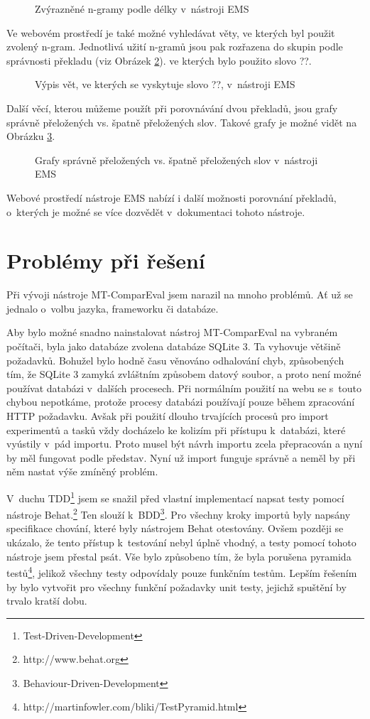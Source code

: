 \begin{figure}
  \caption{Zvýrazněné \mbox{n-gramy} podle délky v~nástroji EMS}
  \label{img:ems-sentence}
\end{figure}

Ve webovém prostředí je také možné vyhledávat věty,
  ve kterých byl použit zvolený \mbox{n-gram}.
Jednotlivá užití \mbox{n-gramů} jsou pak rozřazena do skupin podle správnosti překladu (viz Obrázek \ref{img:ems-word}).
  ve kterých bylo použito slovo ??.

\begin{figure}
  \caption{Výpis vět, ve kterých se vyskytuje slovo ??, v~nástroji EMS}
  \label{img:ems-word}
\end{figure}

Další věcí, kterou můžeme použít při porovnávání dvou překladů,
  jsou grafy správně přeložených vs. špatně přeložených slov.
Takové grafy je možné vidět na Obrázku \ref{img:ems-charts}.

\begin{figure}
  \caption{Grafy správně přeložených vs. špatně přeložených slov v~nástroji EMS}
  \label{img:ems-charts}
\end{figure}

Webové prostředí nástroje EMS nabízí i další možnosti porovnání překladů,
  o~kterých je možné se více dozvědět v~dokumentaci tohoto nástroje.

\section{Problémy při řešení}
Při vývoji nástroje MT-ComparEval jsem narazil na mnoho problémů.
Ať už se jednalo o~volbu jazyka, frameworku či databáze.

Aby bylo možné snadno nainstalovat nástroj MT-ComparEval na vybraném počítači,
  byla jako databáze zvolena databáze SQLite 3.
Ta vyhovuje většině požadavků.
Bohužel bylo hodně času věnováno odhalování chyb,
  způsobených tím,
  že SQLite 3 zamyká zvláštním způsobem datový soubor,
  a proto není možné používat databázi v~dalších procesech.
Při normálním použití na webu se s~touto chybou nepotkáme,
  protože procesy databázi používají pouze během zpracování HTTP požadavku.
Avšak při použití dlouho trvajících procesů pro import experimentů a tasků
  vždy docházelo ke kolizím při přístupu k~databázi,
  které vyústily v~pád importu.
Proto musel být návrh importu zcela přepracován a nyní by měl fungovat podle představ.
Nyní už import funguje správně a neměl by při něm nastat výše zmíněný problém.


V~duchu TDD\footnote{Test-Driven-Development}
  jsem se snažil před vlastní implementací napsat testy pomocí nástroje Behat.\footnote{http://www.behat.org}
Ten slouží k~BDD\footnote{Behaviour-Driven-Development}.
Pro všechny kroky importů byly napsány specifikace chování, které byly nástrojem Behat otestovány.
Ovšem později se ukázalo, že tento přístup k~testování nebyl úplně vhodný, a testy pomocí tohoto nástroje jsem přestal psát.
Vše bylo způsobeno tím, že byla porušena pyramida testů\footnote{http://martinfowler.com/bliki/TestPyramid.html},
  jelikož všechny testy odpovídaly pouze funkčním testům.
Lepším řešením by bylo vytvořit pro všechny funkční požadavky unit testy,
  jejichž spuštění by trvalo kratší dobu.
